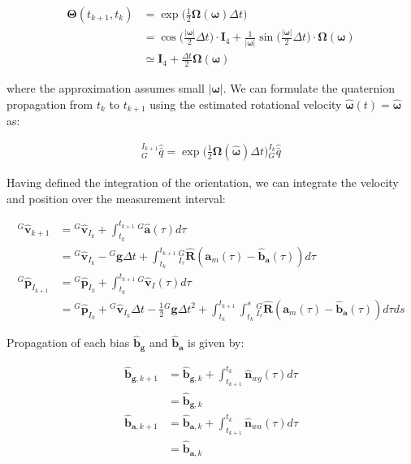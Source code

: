 \begin{align*} \boldsymbol{\Theta}(t_{k+1},t_k) &= \exp\bigg(\frac{1}{2}\boldsymbol{\Omega}(\boldsymbol{\omega})\Delta t\bigg)\\ &= \cos\bigg(\frac{|\boldsymbol{\omega}|}{2} \Delta t \bigg) \cdot \mathbf{I}_4 + \frac{1}{|\boldsymbol{\omega}|}\sin\bigg(\frac{|\boldsymbol{\omega}|}{2} \Delta t \bigg) \cdot \boldsymbol{\Omega}(\boldsymbol{\omega})\\ &\simeq \mathbf{I}_4 + \frac{\Delta t}{2}\boldsymbol{\Omega}(\boldsymbol{\omega}) \end{align*}

where the approximation assumes small $|\boldsymbol{\omega}|$. We can formulate the quaternion propagation from $t_k$ to $t_{k+1}$ using the estimated rotational velocity $\hat{\boldsymbol{\omega}}(t) = \hat{\boldsymbol{\omega}}$ as\+:

\begin{align*} \text{}^{I_{k+1}}_{G}\hat{\bar{q}} = \exp\bigg(\frac{1}{2}\boldsymbol{\Omega}(\hat{\boldsymbol{\omega}})\Delta t\bigg) \text{}^{I_{k}}_{G}\hat{\bar{q}} \end{align*}

Having defined the integration of the orientation, we can integrate the velocity and position over the measurement interval\+:

\begin{align*} ^G\hat{\mathbf{v}}_{k+1} &= \text{}^G\hat{\mathbf{v}}_{I_k} + \int_{t_{k}}^{t_{k+1}} {^G\hat{\mathbf{a}}(\tau)} d\tau \\ &= \text{}^G\hat{\mathbf{v}}_{I_k} - {}^G\mathbf{g}\Delta t+ \int_{t_{k}}^{t_{k+1}} {^G_{I_{\tau}}\hat{\mathbf{R}}(\mathbf{a}_m(\tau) - \hat{\mathbf{b}}_{\mathbf{a}}(\tau)) d\tau}\\[1em] ^G\hat{\mathbf{p}}_{I_{k+1}} &= \text{}^G\hat{\mathbf{p}}_{I_k} + \int_{t_{k}}^{t_{k+1}} {^G\hat{\mathbf{v}}_I(\tau)} d\tau \\ &= \text{}^G\hat{\mathbf{p}}_{I_k} + \text{}^G\hat{\mathbf{v}}_{I_k} \Delta t - \frac{1}{2}{}^G\mathbf{g}\Delta t^2 + \int_{t_{k}}^{t_{k+1}} \int_{t_{k}}^{s} {^G_{I_{\tau}}\hat{\mathbf{R}}(\mathbf{a}_m(\tau) - \hat{\mathbf{b}}_{\mathbf{a}}(\tau)) d\tau ds} \end{align*}

Propagation of each bias $\hat{\mathbf{b}}_{\mathbf{g}}$ and $\hat{\mathbf{b}}_{\mathbf{a}}$ is given by\+:

\begin{align*} \hat{\mathbf{b}}_{\mathbf{g},k+1} &= \hat{\mathbf{b}}_{\mathbf{g},k} + \int_{t_{k+1}}^{t_{k}} {\hat{\mathbf{n}}_{wg}(\tau)} d\tau \\ &= \hat{\mathbf{b}}_{\mathbf{g},k} \\ \hat{\mathbf{b}}_{\mathbf{a},k+1} &= \hat{\mathbf{b}}_{\mathbf{a},k} + \int_{t_{k+1}}^{t_{k}} {\hat{\mathbf{n}}_{wa}(\tau)} d\tau \\ &= \hat{\mathbf{b}}_{\mathbf{a},k} \end{align*}

